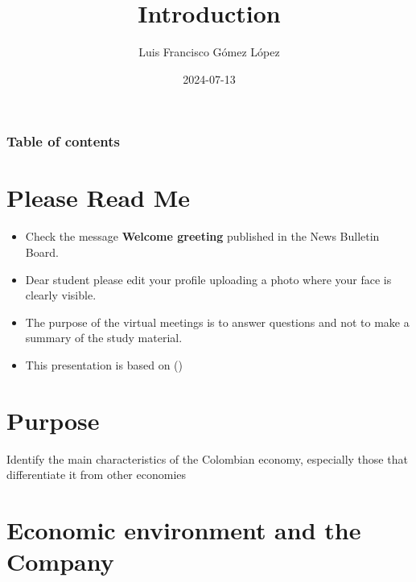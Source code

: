 \documentclass[
  ignorenonframetext,
]{beamer}
\title{Introduction}
\author{Luis Francisco Gómez López}
\date{2024-07-13}
\institute{FAEDIS}
\renewcommand*\contentsname{Table of contents}
\newcommand\contentsname{Table of contents}
\begin{document}
\frame{\titlepage}

\renewcommand*\contentsname{Table of contents}
\begin{frame}[allowframebreaks]
  \frametitle{Table of contents}
  \tableofcontents[hideallsubsections]
\end{frame}

\section{Please Read Me}\label{please-read-me}

\begin{frame}{}
\label{section}
\begin{itemize}
\item
  Check the message \textbf{Welcome greeting} published in the News
  Bulletin Board.
\item
  Dear student please edit your profile uploading a photo where your
  face is clearly visible.
\item
  The purpose of the virtual meetings is to answer questions and not to
  make a summary of the study material.
\item
  This presentation is based on
  ()
\end{itemize}
\end{frame}

\section{Purpose}\label{purpose}

\begin{frame}{}
\label{section-1}
Identify the main characteristics of the Colombian economy, especially
those that differentiate it from other economies
\end{frame}

\section{Economic environment and the
Company}\label{economic-environment-and-the-company}
\end{document}
